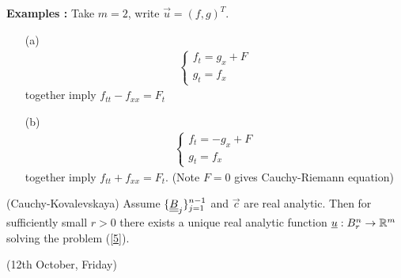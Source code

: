 \documentclass[10pt,a4paper]{report}
\begin{document}
\textbf{Examples :} Take $m=2$, write $\vec{u} = (f, g)^T$.
\begin{itemize}
\item[(a)] \begin{align*}
\begin{cases}
f_t= g_x + F\\
g_t = f_x
\end{cases}
\end{align*}
together imply $f_{tt} - f_{xx} = F_t$
\item[(b)] \begin{align*}
\begin{cases}
f_t= -g_x + F\\
g_t = f_x
\end{cases}
\end{align*}
together imply $f_{tt} + f_{xx} = F_t$. (Note $F=0$ gives Cauchy-Riemann equation)
\end{itemize}
\s

\thm (Cauchy-Kovalevskaya) Assume $\{\underline{\underline{B}}_j \}_{j=1}^{n-1}$ and $\vec{c}$ are real analytic. Then for sufficiently small $r>0$ there exists a unique real analytic function $\underline{u} : B_r^n \rightarrow \mathbb{R}^m$ solving the problem (\ref{5}).
\s

\newday

(12th October, Friday)
\s
\end{document}

